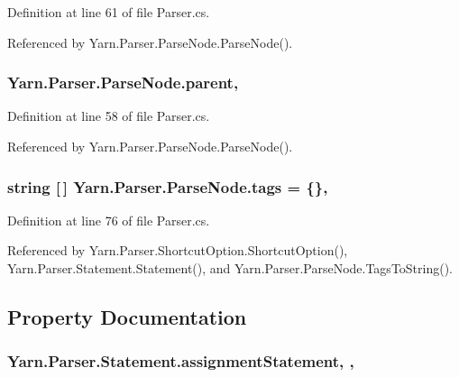 Definition at line 61 of file Parser.\-cs.



Referenced by Yarn.\-Parser.\-Parse\-Node.\-Parse\-Node().

\hypertarget{a00142_af313a82103fcc2ff5a177dbb06b92f7b}{
\subsubsection[{parent}]{ Yarn.\-Parser.\-Parse\-Node.\-parent\hspace{0.3cm}{\ttfamily [package]}, {\ttfamily [inherited]}}}\label{a00142_af313a82103fcc2ff5a177dbb06b92f7b}


Definition at line 58 of file Parser.\-cs.



Referenced by Yarn.\-Parser.\-Parse\-Node.\-Parse\-Node().

\hypertarget{a00142_a58b3a15788fd2d4127d73619dc6d04ae}{
\subsubsection[{tags}]{\setlength{\rightskip}{0pt plus 5cm}string \mbox{[}$\,$\mbox{]} Yarn.\-Parser.\-Parse\-Node.\-tags = \{\}\hspace{0.3cm}{\ttfamily [package]}, {\ttfamily [inherited]}}}\label{a00142_a58b3a15788fd2d4127d73619dc6d04ae}


Definition at line 76 of file Parser.\-cs.



Referenced by Yarn.\-Parser.\-Shortcut\-Option.\-Shortcut\-Option(), Yarn.\-Parser.\-Statement.\-Statement(), and Yarn.\-Parser.\-Parse\-Node.\-Tags\-To\-String().



\subsection{Property Documentation}
\hypertarget{a00160_a7fa97a80f1b9313bc2bd4194e3f75759}{
\subsubsection[{assignment\-Statement}]{ Yarn.\-Parser.\-Statement.\-assignment\-Statement\hspace{0.3cm}{\ttfamily [get]}, {\ttfamily [set]}, {\ttfamily [package]}}}\label{a00160_a7fa97a80f1b9313bc2bd4194e3f75759}


